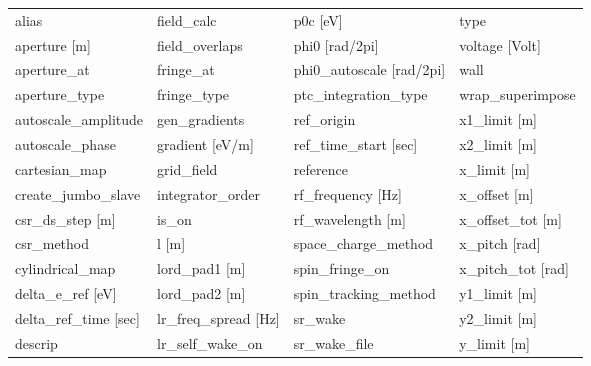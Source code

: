  \begin{tabular}{llll} \toprule
alias                            & field_calc                       & p0c [eV]                         & type                             \\
aperture [m]                     & field_overlaps                   & phi0 [rad/2pi]                   & voltage [Volt]                   \\
aperture_at                      & fringe_at                        & phi0_autoscale [rad/2pi]         & wall                             \\
aperture_type                    & fringe_type                      & ptc_integration_type             & wrap_superimpose                 \\
autoscale_amplitude              & gen_gradients                    & ref_origin                       & x1_limit [m]                     \\
autoscale_phase                  & gradient [eV/m]                  & ref_time_start [sec]             & x2_limit [m]                     \\
cartesian_map                    & grid_field                       & reference                        & x_limit [m]                      \\
create_jumbo_slave               & integrator_order                 & rf_frequency [Hz]                & x_offset [m]                     \\
csr_ds_step [m]                  & is_on                            & rf_wavelength [m]                & x_offset_tot [m]                 \\
csr_method                       & l [m]                            & space_charge_method              & x_pitch [rad]                    \\
cylindrical_map                  & lord_pad1 [m]                    & spin_fringe_on                   & x_pitch_tot [rad]                \\
delta_e_ref [eV]                 & lord_pad2 [m]                    & spin_tracking_method             & y1_limit [m]                     \\
delta_ref_time [sec]             & lr_freq_spread [Hz]              & sr_wake                          & y2_limit [m]                     \\
descrip                          & lr_self_wake_on                  & sr_wake_file                     & y_limit [m]                      \\

\end{tabular}
